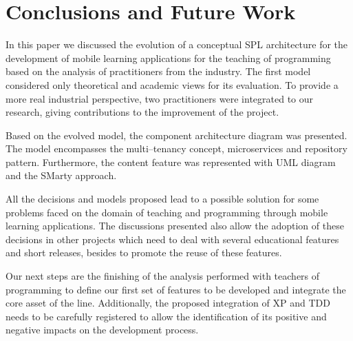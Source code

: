 

\section{Conclusions and Future Work}
\label{sec:conclusions}

In this paper we discussed the evolution of a conceptual SPL architecture for the development of mobile learning applications for the teaching of programming based on the analysis of practitioners from the industry. The first model considered only theoretical and academic views for its evaluation. To provide a more real industrial perspective, two practitioners were integrated to our research, giving contributions to the improvement of the project.

Based on the evolved model, the component architecture diagram was presented. The model encompasses the multi--tenancy concept, microservices and repository pattern. Furthermore, the content feature was represented with UML diagram and the SMarty approach.

All the decisions and models proposed lead to a possible solution for some problems faced on the domain of teaching and programming through mobile learning applications. The discussions presented also allow the adoption of these decisions in other projects which need to deal with several educational features and short releases, besides to promote the reuse of these features.

Our next steps are the finishing of the analysis performed with teachers of programming to define our first set of features to be developed and integrate the core asset of the line. Additionally, the proposed integration of XP and TDD needs to be carefully registered to allow the identification of its positive and negative impacts on the development process.